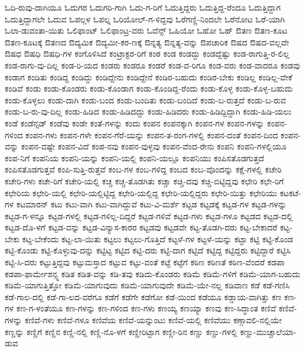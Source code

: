 {ಓದಿ-ರುವು-ದಾಗಿಯೂ
ಓದುಗರ
ಓದುಗರಿ-ಗಾಗಿ
ಓದು-ಗ-ರಿಗೆ
ಓದುತ್ತಿದ್ದರು
ಓದುತ್ತಿದ್ದ-ರೆಂದೂ
ಓದುತ್ತಿದ್ದಾಗ
ಓದುತ್ತಿದ್ದಾಗಲೇ
ಓದುವ
ಓಪಲ್ಗಳ
ಓಪಲ್ನ
ಓರಿಯೋಲ್-ಗ-ಳಿದ್ದವು
ಓರೆಗಣ್ಣಿ-ನಿಂದಲೇ
ಓರೆನೋಟ
ಓರೆ-ಯಾಗಿ
ಓಲಾ-ಡುವಂತಾ-ಯಿತು
ಓಲಿಫಾಂಟ್
ಓಲಿಫಾಂಟ್ರ-ವರು
ಓವೆನ್ಸ್
ಓಹಿಯೋ
ಓಹೋ
ಓಹ್
ಔತಣ
ಔತಣ-ಕೂಟ
ಔತಣ-ಕೂಟಕ್ಕೆ
ಔತಣದ
ಔದ್ಯಮಿಕ
ಔದ್ಯಮೀ-ಕರ-ಣಕ್ಕೆ
ಔನ್ನತ್ಯ
ಔನ್ನತ್ಯ-ವನ್ನು
ಔಪಚಾರಿಕ
ಔಷದ
ಔಷದ-ವಲ್ಲವೇ
ಔಷಧ
ಔಷಧಿ
ಔಷಧಿ-ಗಳ
ಕಂಗೊಳಿಸಿದೆ
ಕಂಟ್ರಾಕ್ಟರ-ರಿಗೆ
ಕಂಠ
ಕಂಡ
ಕಂಡದ್ದು
ಕಂಡದ್ದೆಷ್ಟು
ಕಂಡ-ರಾಗುತ್ತಿ-ರ-ಲಿಲ್ಲ
ಕಂಡ-ರಾಗು-ವು-ದಿಲ್ಲ
ಕಂಡ-ರಿ-ಯದ
ಕಂಡರು
ಕಂಡರೂ
ಕಂಡರೆ
ಕಂಡ-ವ-ರಿಗೂ
ಕಂಡ-ವರು
ಕಂಡ-ವಾದರೂ
ಕಂಡವು
ಕಂಡಾಗ
ಕಂಡಿತು
ಕಂಡಿದ್ದ
ಕಂಡಿದ್ದು
ಕಂಡಿದ್ದೇನು
ಕಂಡಿದ್ದೇನೆ
ಕಂಡಿರ-ಬಹುದು
ಕಂಡಿರ-ಬೇಕು
ಕಂಡಿಲ್ಲ
ಕಂಡಿಲ್ಲ-ವೇಕೆ
ಕಂಡಿವೆ
ಕಂಡು
ಕಂಡು-ಕೊಂಡರು
ಕಂಡು-ಕೊಂಡಾಗ
ಕಂಡು-ಕೊಂಡಿದ್ದ-ರೆಂದು
ಕಂಡು-ಕೊಳ್ಳ
ಕಂಡು-ಕೊಳ್ಳ-ಬಹುದು
ಕಂಡು-ಕೊಳ್ಳಲು
ಕಂಡು-ದಾಗಿ
ಕಂಡು-ಬಂದ
ಕಂಡು-ಬಂದಿತು
ಕಂಡು-ಬಂದಿದೆ
ಕಂಡು-ಬ-ರುತ್ತದೆ
ಕಂಡು-ಬ-ರುವ
ಕಂಡು-ಬ-ರು-ವು-ದಿಲ್ಲ
ಕಂಡು-ಹಿಡಿದ
ಕಂಡು-ಹಿಡಿದದ್ದು
ಕಂಡು-ಹಿಡಿದರು
ಕಂಡು-ಹಿಡಿದ್ದಿದ್ದಾಗಿ
ಕಂಡು-ಹಿಡಿ-ಯಲು
ಕಂಡೆ
ಕಂಡೆನ್ಸಡ್
ಕಂಡೆವು
ಕಂಡೇ
ಕಂತೆ-ಗಳನ್ನು
ಕಂದು
ಕಂಪನ
ಕಂಪನಕ್ಕಾಗಿ
ಕಂಪನ-ಗಳ
ಕಂಪನ-ಗಳನ್ನು
ಕಂಪನ-ಗಳಿಂದ
ಕಂಪನ-ಗಳು
ಕಂಪನ-ಗಳೇ
ಕಂಪನ-ಗೆರೆ-ಯನ್ನು
ಕಂಪನ-ತ-ರಂಗ-ಗಳಲ್ಲಿ
ಕಂಪನ-ದಂತೆ
ಕಂಪನ-ದಿಂದ
ಕಂಪನ-ವನ್ನು
ಕಂಪನ-ವಷ್ಟೇ
ಕಂಪನ-ವಿದೆ
ಕಂಪ-ನವು
ಕಂಪನ-ವುಳ್ಳವು
ಕಂಪನ-ವೆಂದ-ರೇನು
ಕಂಪನಿ
ಕಂಪನಿ-ಗಳಲ್ಲಿಯೂ
ಕಂಪ-ನಿಗೆ
ಕಂಪನಿಯ
ಕಂಪನಿ-ಯನ್ನು
ಕಂಪನಿ-ಯಲ್ಲಿ
ಕಂಪನಿ-ಯಲ್ಲೂ
ಕಂಪನಿಯು
ಕಂಪಿಸತೊಡಗುತ್ತದೆ
ಕಂಪಿಸತೊಡಗುತ್ತವೆ
ಕಂಪಿ-ಸುತ್ತಿ-ರುತ್ತವೆ
ಕಂಬ-ಗಳ
ಕಂಬ-ಗಳಿದ್ದ
ಕಂಬದ
ಕಂಬ-ವೊಂದನ್ನು
ಕಕ್ಷೆ-ಗಳಲ್ಲಿ
ಕಚೇರಿ
ಕಚೇರಿ-ಗಳು
ಕಚೇ-ರಿಗೆ
ಕಚೇರಿ-ಯಲ್ಲಿ
ಕಚ್ಚ
ಕಚ್ಚ-ತೊಡಗಿತು
ಕಚ್ಚಾ
ಕಚ್ಚಿ-ದವು
ಕಚ್ಚಿ-ಬಿಟ್ಟಿದ್ದವು
ಕಛೇರಿ
ಕಛೇ-ರಿಗೆ
ಕಛೇರಿಯ
ಕಛೇರಿ-ಯಲ್ಲಿ
ಕಛೇರಿ-ಯಲ್ಲಿಟ್ಟಿದ್ದ
ಕಛೇರಿ-ಯಲ್ಲಿದ್ದ
ಕಛೇರಿ-ಯಲ್ಲಿದ್ದರು
ಕಛೇರಿ-ಯಿತ್ತು
ಕಛೇರಿಯು
ಕಟಕಟೆ-ಗಳ
ಕಟಮಾರನ್
ಕಟು
ಕಟು-ವಾಗಿ
ಕಟು-ವಾಗಿದ್ದುವೆ
ಕಟು-ವಿ-ಮರ್ಶೆ
ಕಟ್ಟಡ
ಕಟ್ಟಡಕ್ಕೆ
ಕಟ್ಟಡ-ಗಳ
ಕಟ್ಟಡ-ಗಳನ್ನು
ಕಟ್ಟಡ-ಗ-ಳನ್ನೂ
ಕಟ್ಟಡ-ಗಳಲ್ಲಿ
ಕಟ್ಟಡ-ಗಳಿಲ್ಲ-ದಿದ್ದರೆ
ಕಟ್ಟಡ-ಗಳಿವೆ
ಕಟ್ಟಡ-ಗಳು
ಕಟ್ಟಡ-ಗಳೂ
ಕಟ್ಟಡದ
ಕಟ್ಟಡ-ದಲ್ಲಿ
ಕಟ್ಟಡ-ದೊ-ಳಗೆ
ಕಟ್ಟಡ-ವನ್ನು
ಕಟ್ಟಡ-ವಿನ್ಯಾಸ-ಕಾರರ
ಕಟ್ಟಡವು
ಕಟ್ಟಡವೇ
ಕಟ್ಟ-ತೊಡಗಿ-ದರು
ಕಟ್ಟ-ಬೇಕಾದರೆ
ಕಟ್ಟ-ಬೇಕು
ಕಟ್ಟ-ಬೇಕೆಂದು
ಕಟ್ಟ-ಲಾ-ಯಿತು
ಕಟ್ಟಲು
ಕಟ್ಟಲು-ಗೊತ್ತಿದೆ
ಕಟ್ಟಳೆ-ಗಳ
ಕಟ್ಟಳೆ-ಯನ್ನು
ಕಟ್ಟಾ
ಕಟ್ಟಿ
ಕಟ್ಟಿ-ಕೊಂಡ
ಕಟ್ಟಿ-ಕೊಂಡು
ಕಟ್ಟಿ-ಕೊಳ್ಳುವು-ದನ್ನು
ಕಟ್ಟಿಟ್ಟ
ಕಟ್ಟಿದ
ಕಟ್ಟಿ-ದರು
ಕಟ್ಟಿ-ದಾಗ
ಕಟ್ಟಿದೆ
ಕಟ್ಟಿದ್ದ
ಕಟ್ಟಿದ್ದರು
ಕಟ್ಟಿದ್ದಾರೆ
ಕಟ್ಟಿಸಿ
ಕಟ್ಟಿ-ಸಿ-ದರು
ಕಟ್ಟುತ್ತಿದ್ದವು
ಕಟ್ಟುಮಸ್ತಾದ
ಕಟ್ಟುವ
ಕಟ್ಟು-ವಂತೆ
ಕಟ್ಟೆ
ಕಟ್ಟೆಗೆ
ಕಠಿಣ
ಕಠಿಣತೆ
ಕಠಿಣ-ವೆಂದರೆ
ಕಡಪಾ
ಕಡಪಾ-ಫಾರ್ಮೇಶನ್ಸ್ನ
ಕಡಿತ
ಕಡಿತ-ವನ್ನು
ಕಡಿ-ತವು
ಕಡಿದು-ಕೊಂಡರು
ಕಡಿಮೆ
ಕಡಿಮೆ-ಗಳಿಗೆ
ಕಡಿಮೆ-ಯಾಗ-ಬಹುದು
ಕಡಿಮೆ-ಯಾಗುತ್ತಿತ್ತೋ
ಕಡಿಮೆ-ಯಾಗುವುದು
ಕಡಿಮೆ-ಯಾಗುವುದೇ
ಕಡಿಮೆ-ಯೇ-ನಲ್ಲ
ಕಡಿವಾಣ
ಕಡೆ
ಕಡೆ-ಗಣಿಸಿ
ಕಡೆ-ಗಾಲ-ದಲ್ಲಿ
ಕಡೆ-ಗಾ-ಲದ-ವರೆಗೂ
ಕಡೆಗೆ
ಕಡೆಗೇ
ಕಡೆಗೋ
ಕಡೆ-ಯಿಂದ
ಕಡೆಯೂ
ಕಡ್ಡಾಯ-ವಾಗಿತ್ತು
ಕಣ
ಕಣ-ಗಳ
ಕಣ-ಗ-ಳಂತೆಯೂ
ಕಣ-ಗಳನ್ನು
ಕಣ-ಗಳಿಂದ
ಕಣ-ಗಳು
ಕಣಯ್ಯ
ಕಣಯ್ಯಾ
ಕಣವು
ಕಣ-ಸಿದ್ಧಾಂತ
ಕಣಿವೆ
ಕಣಿವೆ-ಗಳನ್ನು
ಕಣಿವೆ-ಗಳು
ಕಣಿವೆ-ಗಳೂ
ಕಣಿವೆಯ
ಕಣಿವೆ-ಯನ್ನುಂಟು
ಕಣಿವೆ-ಯಲ್ಲಿ
ಕಣಿವೆಯು
ಕಣ್ಗಾವಲಿ-ನಲ್ಲಿಯೇ
ಕಣ್ಣನ್ನು
ಕಣ್ಣಿಗೆ
ಕಣ್ಣಿನ
ಕಣ್ಣಿ-ನಲ್ಲಿ
ಕಣ್ಣಿ-ನೊ-ಳಗೆ
ಕಣ್ಣೀರಿಟ್ಟಾಗ
ಕಣ್ಣೀ-ರಿನ
ಕಣ್ಣು
ಕಣ್ಣು-ಗಳಲ್ಲಿ
ಕಣ್ಣು-ಮುಚ್ಚಾಲೆಯಾ-ಡುವ
}
